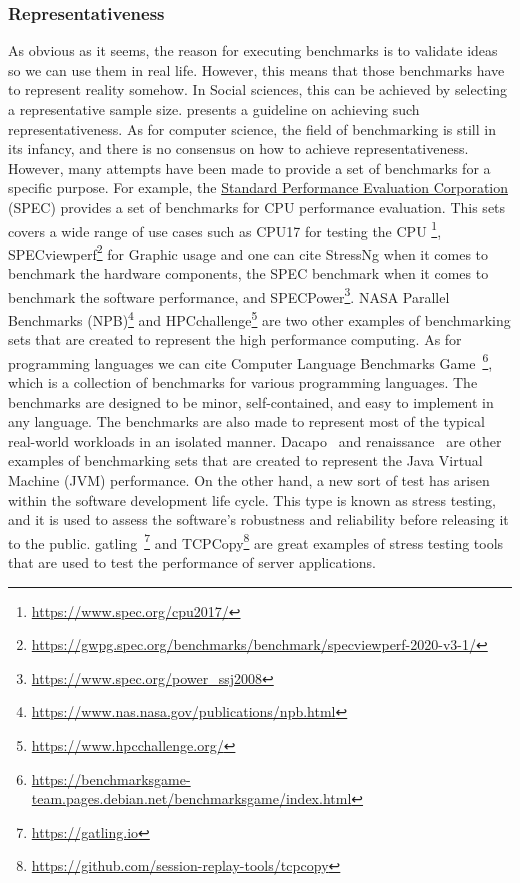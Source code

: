 \subsubsection{Representativeness}
As obvious as it seems, the reason for executing benchmarks is to validate ideas so we can use them in real life.
However, this means that those benchmarks have to represent reality somehow. In Social sciences, this can be achieved by selecting a representative sample size. \citeauthor{omair2014sample} presents a guideline on achieving such representativeness.
As for computer science, the field of benchmarking is still in its infancy, and there is no consensus on how to achieve representativeness. However, many attempts have been made to provide a set of benchmarks for a specific purpose.
For example, the \href{https://www.spec.org/}{Standard Performance Evaluation Corporation} (SPEC) provides a set of benchmarks for CPU performance evaluation. This sets covers a wide range of use cases such as  CPU17 for testing the CPU \footnote{\url{https://www.spec.org/cpu2017/}}, SPECviewperf\footnote{\url{https://gwpg.spec.org/benchmarks/benchmark/specviewperf-2020-v3-1/}} for Graphic usage and
one can cite StressNg when it comes to benchmark the hardware components, the SPEC benchmark when it comes to benchmark the software performance, and SPECPower\footnote{\url{https://www.spec.org/power_ssj2008} }.
NASA Parallel Benchmarks (NPB)\footnote{\url{https://www.nas.nasa.gov/publications/npb.html}} and HPCchallenge\footnote{\url{https://www.hpcchallenge.org/}} are two other examples of benchmarking sets that are created to represent the high performance computing.
As for programming languages we can cite Computer Language Benchmarks Game~\footnote{\url{https://benchmarksgame-team.pages.debian.net/benchmarksgame/index.html}}, which is a collection of benchmarks for various programming languages. The benchmarks are designed to be minor, self-contained, and easy to implement in any language.
The benchmarks are also made to represent most of the typical real-world workloads in an isolated manner.
Dacapo~\cite{blackburn2006dacapo} and renaissance~\cite{renaissance} are other examples of benchmarking sets that are created to represent the Java Virtual Machine (JVM) performance.
On the other hand, a new sort of test has arisen within the software development life cycle.
This type is known as stress testing, and it is used to assess the software's robustness and reliability before releasing it to the public. gatling~\footnote{\url{https://gatling.io}} and TCPCopy\footnote{\url{https://github.com/session-replay-tools/tcpcopy}} are great examples of stress testing tools that are used to test the performance of server applications.

